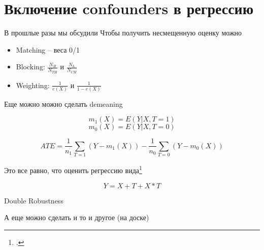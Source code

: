 
\section{Включение confounders в регрессию}

\begin{frame}{В прошлые разы мы обсудили}
Чтобы получить несмещенную оценку можно 
\begin{itemize}
    \item Matching -- веса 0/1
    \item Blocking: $\frac{N_H}{N_{TH}}$ и $\frac{N_L}{N_{CH}}$
    \item Weighting: $\frac{1}{e(X)}$ и $\frac{1}{1 - e(X)}$
\end{itemize}

\end{frame}

\begin{frame}{Еще можно можно сделать demeaning}

$$m_1(X) = E(Y|X, T=1)$$
$$m_0(X) = E(Y|X, T=0)$$

$$ATE = \frac{1}{n_1}\sum_{T=1}\left(Y - m_1(X)\right) - \frac{1}{n_0}\sum_{T=0}\left(Y - m_0(X)\right)$$

Это все равно, что оценить регрессию вида\footcitetext[По-русски можно почиать у ][]{enikolopov2009ecm}

$$Y = X + T + X*T$$  


\end{frame}

\begin{frame}{Double Robustness}

А еще можно сделать и то и другое
(на доске)

\end{frame}





